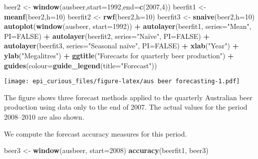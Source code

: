 \documentclass[
]{article}
\newenvironment{Shaded}{\begin{snugshade}}{\end{snugshade}}
\newcommand{\DataTypeTok}[1]{\textcolor[rgb]{0.13,0.29,0.53}{#1}}
\newcommand{\DecValTok}[1]{\textcolor[rgb]{0.00,0.00,0.81}{#1}}
\newcommand{\KeywordTok}[1]{\textcolor[rgb]{0.13,0.29,0.53}{\textbf{#1}}}
\newcommand{\NormalTok}[1]{#1}
\newcommand{\OperatorTok}[1]{\textcolor[rgb]{0.81,0.36,0.00}{\textbf{#1}}}
\newcommand{\OtherTok}[1]{\textcolor[rgb]{0.56,0.35,0.01}{#1}}
\newcommand{\StringTok}[1]{\textcolor[rgb]{0.31,0.60,0.02}{#1}}
\begin{document}
\begin{Shaded}
\begin{Highlighting}[]
\NormalTok{beer2 <-}\StringTok{ }\KeywordTok{window}\NormalTok{(ausbeer,}\DataTypeTok{start=}\DecValTok{1992}\NormalTok{,}\DataTypeTok{end=}\KeywordTok{c}\NormalTok{(}\DecValTok{2007}\NormalTok{,}\DecValTok{4}\NormalTok{))}
\NormalTok{beerfit1 <-}\StringTok{ }\KeywordTok{meanf}\NormalTok{(beer2,}\DataTypeTok{h=}\DecValTok{10}\NormalTok{)}
\NormalTok{beerfit2 <-}\StringTok{ }\KeywordTok{rwf}\NormalTok{(beer2,}\DataTypeTok{h=}\DecValTok{10}\NormalTok{)}
\NormalTok{beerfit3 <-}\StringTok{ }\KeywordTok{snaive}\NormalTok{(beer2,}\DataTypeTok{h=}\DecValTok{10}\NormalTok{)}
\KeywordTok{autoplot}\NormalTok{(}\KeywordTok{window}\NormalTok{(ausbeer, }\DataTypeTok{start=}\DecValTok{1992}\NormalTok{)) }\OperatorTok{+}
\StringTok{  }\KeywordTok{autolayer}\NormalTok{(beerfit1, }\DataTypeTok{series=}\StringTok{"Mean"}\NormalTok{, }\DataTypeTok{PI=}\OtherTok{FALSE}\NormalTok{) }\OperatorTok{+}
\StringTok{  }\KeywordTok{autolayer}\NormalTok{(beerfit2, }\DataTypeTok{series=}\StringTok{"Naïve"}\NormalTok{, }\DataTypeTok{PI=}\OtherTok{FALSE}\NormalTok{) }\OperatorTok{+}
\StringTok{  }\KeywordTok{autolayer}\NormalTok{(beerfit3, }\DataTypeTok{series=}\StringTok{"Seasonal naïve"}\NormalTok{, }\DataTypeTok{PI=}\OtherTok{FALSE}\NormalTok{) }\OperatorTok{+}
\StringTok{  }\KeywordTok{xlab}\NormalTok{(}\StringTok{"Year"}\NormalTok{) }\OperatorTok{+}\StringTok{ }\KeywordTok{ylab}\NormalTok{(}\StringTok{"Megalitres"}\NormalTok{) }\OperatorTok{+}
\StringTok{  }\KeywordTok{ggtitle}\NormalTok{(}\StringTok{"Forecasts for quarterly beer production"}\NormalTok{) }\OperatorTok{+}
\StringTok{  }\KeywordTok{guides}\NormalTok{(}\DataTypeTok{colour=}\KeywordTok{guide_legend}\NormalTok{(}\DataTypeTok{title=}\StringTok{"Forecast"}\NormalTok{))}
\end{Highlighting}
\end{Shaded}

\texttt{[image: epi\_curious\_files/figure-latex/aus beer forecasting-1.pdf]}

The figure shows three forecast methods applied to the quarterly
Australian beer production using data only to the end of 2007. The
actual values for the period 2008--2010 are also shown.

We compute the forecast accuracy measures for this period.

\begin{Shaded}
\begin{Highlighting}[]
\NormalTok{beer3 <-}\StringTok{ }\KeywordTok{window}\NormalTok{(ausbeer, }\DataTypeTok{start=}\DecValTok{2008}\NormalTok{)}
\KeywordTok{accuracy}\NormalTok{(beerfit1, beer3)}
\end{Highlighting}
\end{Shaded}
\end{document}
